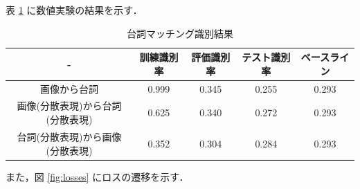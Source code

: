 \documentclass[onecolumn]{ujarticle}   %
\begin{document}
	表 \ref{tab:result} に数値実験の結果を示す．
	\begin{table}[h]
		\vspace{-3mm}
		\centering
		\caption{台詞マッチング識別結果}
		\label{tab:result}
		\begin{tabular}{|c|c|c|c|c|} \hline
		  -&訓練識別率&評価識別率&テスト識別率&ベースライン\\ \hline\hline
			画像から台詞&0.999&0.345&0.255&0.293\\ \hline
			画像(分散表現)から台詞(分散表現)&0.625&0.340&0.272&0.293\\ \hline
			台詞(分散表現)から画像(分散表現)&0.352&0.304&0.284&0.293\\ \hline
		\end{tabular}
	\end{table}

	また，図 \ref{fig:losses} にロスの遷移を示す．
\end{document}
